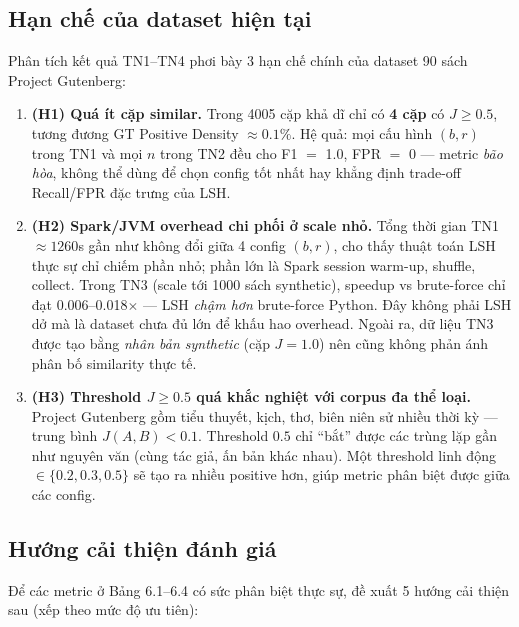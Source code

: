 \subsection{Hạn chế của dataset hiện tại}
\label{subsec:dataset-limits}

Phân tích kết quả TN1--TN4 phơi bày 3 hạn chế chính của dataset 90 sách Project Gutenberg:

\begin{enumerate}
    \item \textbf{(H1) Quá ít cặp similar.} Trong 4005 cặp khả dĩ chỉ có \textbf{4 cặp} có $J \geq 0.5$, tương đương GT Positive Density $\approx 0.1\%$. Hệ quả: mọi cấu hình $(b, r)$ trong TN1 và mọi $n$ trong TN2 đều cho F1 $=$ 1.0, FPR $=$ 0 --- metric \emph{bão hòa}, không thể dùng để chọn config tốt nhất hay khẳng định trade-off Recall/FPR đặc trưng của LSH.

    \item \textbf{(H2) Spark/JVM overhead chi phối ở scale nhỏ.} Tổng thời gian TN1 $\approx 1260$s gần như không đổi giữa 4 config $(b, r)$, cho thấy thuật toán LSH thực sự chỉ chiếm phần nhỏ; phần lớn là Spark session warm-up, shuffle, collect. Trong TN3 (scale tới 1000 sách synthetic), speedup vs brute-force chỉ đạt 0.006--0.018$\times$ --- LSH \emph{chậm hơn} brute-force Python. Đây không phải LSH dở mà là dataset chưa đủ lớn để khấu hao overhead. Ngoài ra, dữ liệu TN3 được tạo bằng \emph{nhân bản synthetic} (cặp $J = 1.0$) nên cũng không phản ánh phân bố similarity thực tế.

    \item \textbf{(H3) Threshold $J \geq 0.5$ quá khắc nghiệt với corpus đa thể loại.} Project Gutenberg gồm tiểu thuyết, kịch, thơ, biên niên sử nhiều thời kỳ --- trung bình $J(A, B) < 0.1$. Threshold $0.5$ chỉ ``bắt'' được các trùng lặp gần như nguyên văn (cùng tác giả, ấn bản khác nhau). Một threshold linh động $\in \{0.2, 0.3, 0.5\}$ sẽ tạo ra nhiều positive hơn, giúp metric phân biệt được giữa các config.
\end{enumerate}

\subsection{Hướng cải thiện đánh giá}

Để các metric ở Bảng 6.1--6.4 có sức phân biệt thực sự, đề xuất 5 hướng cải thiện sau (xếp theo mức độ ưu tiên):

